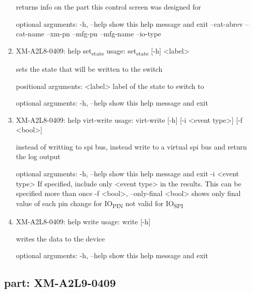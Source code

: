 \documentclass[11pt]{article}
\begin{document}
\begin{enumerate}
returns info on the part this control screen was designed for

optional arguments:
  -h, --help   show this help message and exit
  --cat-abrev
  --cat-name
  --xm-pn
  --mfg-pn
  --mfg-name
  --io-type

\item XM-A2L8-0409: help set\textsubscript{state}
\label{sec:org250bcf3}
usage: set\textsubscript{state} [-h] <label>

sets the state that will be written to the switch

positional arguments:
  <label>     label of the state to switch to

optional arguments:
  -h, --help  show this help message and exit

\item XM-A2L8-0409: help virt-write
\label{sec:org79c7193}
usage: virt-write [-h] [-i <event type>] [-f <bool>]

instead of writting to spi bus, instead write to a virtual spi bus and return
the log output

optional arguments:
  -h, --help            show this help message and exit
  -i <event type>       If specified, include only <event type> in the
                        results. This can be specified more than once
  -f <bool>, --only-final <bool>
                        shows only final value of each pin change for IO\textsubscript{PIN}
                        not valid for IO\textsubscript{SPI}

\item XM-A2L8-0409: help write
\label{sec:org5a4c83b}
usage: write [-h]

writes the data to the device

optional arguments:
  -h, --help  show this help message and exit
\end{enumerate}

\subsection{part: XM-A2L9-0409}
\label{sec:orgd2bf431}
\end{document}
